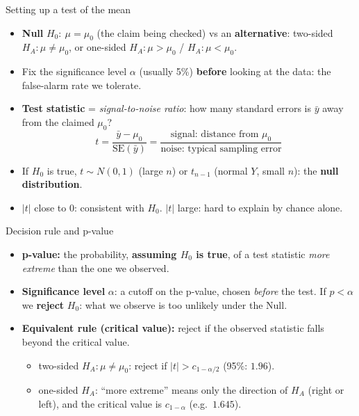 \documentclass[
  11pt,
  ignorenonframetext,
  aspectratio=169,
]{beamer}
\providecommand{\tightlist}{%
  \setlength{\itemsep}{0pt}\setlength{\parskip}{0pt}}
\newcommand{\se}{\mathrm{SE}}
\begin{document}
\begin{frame}{Setting up a test of the mean}
\protect{}\label{setting-up-a-test-of-the-mean}
\begin{itemize}
\tightlist
\item
  \textbf{Null} \(H_0:\ \mu=\mu_0\) (the claim being checked) vs an
  \textbf{alternative}: two-sided \(H_A:\mu\neq\mu_0\), or one-sided
  \(H_A:\mu>\mu_0\) / \(H_A:\mu<\mu_0\).
\item
  Fix the significance level \(\alpha\) (usually 5\%) \textbf{before}
  looking at the data: the false-alarm rate we tolerate.
\item
  \textbf{Test statistic} = \emph{signal-to-noise ratio}: how many
  standard errors is \(\bar y\) away from the claimed \(\mu_0\)?
  \[t=\frac{\bar y-\mu_0}{\se(\bar y)}=\frac{\text{signal: distance from }\mu_0}{\text{noise: typical sampling error}}\]
\item
  If \(H_0\) is true, \(t\sim N(0,1)\) (large \(n\)) or \(t_{n-1}\)
  (normal \(Y\), small \(n\)): the \textbf{null distribution}.
\item
  \(|t|\) close to 0: consistent with \(H_0\). \(|t|\) large: hard to
  explain by chance alone.
\end{itemize}
\end{frame}

\begin{frame}{Decision rule and p-value}
\protect{}\label{decision-rule-and-p-value}
\begin{itemize}
\item
  \textbf{p-value:} the probability, \textbf{assuming \(H_0\) is true},
  of a test statistic \emph{more extreme} than the one we observed.
\item
  \textbf{Significance level} \(\alpha\): a cutoff on the p-value,
  chosen \emph{before} the test. If \(p<\alpha\) we \textbf{reject}
  \(H_0\): what we observe is too unlikely under the Null.
\item
  \textbf{Equivalent rule (critical value):} reject if the observed
  statistic falls beyond the critical value.

  \begin{itemize}
  \tightlist
  \item
    two-sided \(H_A:\mu\neq\mu_0\): reject if \(|t|>c_{1-\alpha/2}\)
    (95\%: \(1.96\)).
  \item
    one-sided \(H_A\): ``more extreme'' means only the direction of
    \(H_A\) (right or left), and the critical value is \(c_{1-\alpha}\)
    (e.g.~\(1.645\)).
  \end{itemize}
\end{itemize}
\end{frame}
\end{document}

